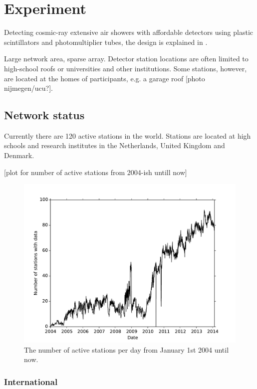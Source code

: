 \chapter{\hisparc Experiment}
\label{ch:hisparc-experiment}

Detecting cosmic-ray extensive air showers with affordable detectors
using plastic scintillators and photomultiplier tubes, the design is
explained in .

Large network area, sparse array. Detector station locations are often
limited to high-school roofs or universities and other institutions.
Some stations, however, are located at the homes of participants, e.g.
a garage roof [photo nijmegen/ucu?].


\section{Network status}

Currently there are 120 active \hisparc stations in the world. Stations
are located at high schools and research institutes in the Netherlands,
United Kingdom and Denmark.

[plot for number of active stations from 2004-ish untill now]

\begin{figure}
    \centering
    \includegraphics[width=0.7\linewidth]
        {plots/network/number_of_stations_with_data_per_day}
    \caption{ The number of active
             stations per day from January 1st 2004 until now.}
    \label{fig:number_of_stations_with_data_per_day}
\end{figure}


\subsection{International}

